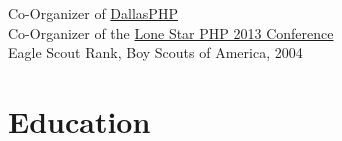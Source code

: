 \documentclass{resume}
\begin{document}
Co-Organizer of \href{http://www.meetup.com/dallasphp/}{DallasPHP}
\\
Co-Organizer of the \href{http://lonestarphp.com/}{Lone Star PHP 2013 Conference}
\\
Eagle Scout Rank, Boy Scouts of America, 2004

\section{Education}

\end{document}
